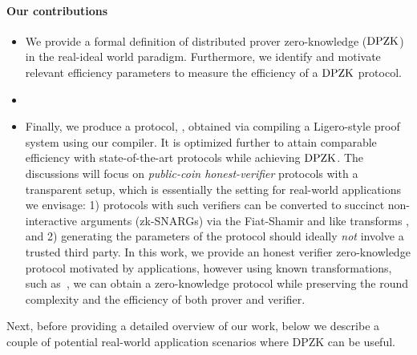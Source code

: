 \paragraph*{Our contributions}
\begin{itemize}
	\item We provide a formal definition of distributed prover zero-knowledge ($\text{DPZK}$) in the real-ideal world paradigm. Furthermore, we identify and motivate relevant efficiency parameters to measure the efficiency of a $\text{DPZK}$ protocol. %
	\item {}
	\item {}Finally, we produce a protocol, \name,  obtained via compiling a Ligero-style proof system using our compiler. It is optimized further to attain comparable efficiency with state-of-the-art protocols while achieving $\text{DPZK}$.
	The discussions will focus on {\em public-coin honest-verifier} protocols with a transparent setup, which is essentially the setting for real-world applications we envisage: 1) protocols with such verifiers can be converted to succinct non-interactive arguments (zk-SNARGs) via the Fiat-Shamir and like transforms \cite{FS86, BCS16}, and 2) generating the parameters of the protocol should ideally {\em not} involve a trusted third party. In this work, we provide an honest verifier zero-knowledge protocol motivated by applications, however using known transformations, such as~\cite{hubavcek2018efficiency}, we can obtain a zero-knowledge protocol while preserving the round complexity and the efficiency of both prover and verifier.
\end{itemize}
Next, before providing a detailed overview of our work, below we describe a couple of potential real-world application scenarios where DPZK can be useful. 


